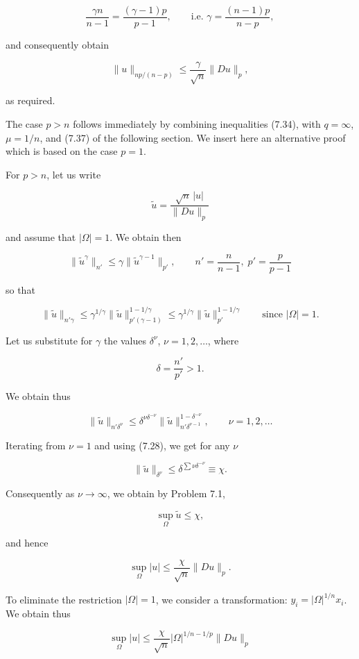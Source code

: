 \begin{theorem}
\[
\frac{\gamma n}{n-1} = \frac{(\gamma-1)p}{p-1}, \qquad \text{i.e. } \gamma = \frac{(n-1)p}{n-p},
\]

and consequently obtain

\[
\|u\|_{np/(n-p)} \le \frac{\gamma}{\sqrt{n}}\|Du\|_p,
\]

as required.

The case $p>n$ follows immediately by combining inequalities (7.34), with $q=\infty$, $\mu=1/n$, and (7.37) of the following section. We insert here an alternative proof which is based on the case $p=1$.

For $p>n$, let us write

\[
\tilde{u} = \frac{\sqrt{n}\,|u|}{\|Du\|_p}
\]


and assume that $|\Omega| = 1$. We obtain then

$$
\| \tilde{u}^{\gamma} \|_{n'} \le \gamma \| \tilde{u}^{\gamma - 1} \|_{p'}, \qquad n' = \frac{n}{n-1}, \; p' = \frac{p}{p-1}
$$

so that

$$
\| \tilde{u} \|_{n'\gamma} \le \gamma^{1/\gamma} \| \tilde{u} \|_{p'(\gamma - 1)}^{1 - 1/\gamma}
\le \gamma^{1/\gamma} \| \tilde{u} \|_{p'}^{1 - 1/\gamma} \qquad \text{since } |\Omega| = 1 .
$$

Let us substitute for $\gamma$ the values $\delta^{\nu}$, $\nu = 1,2,\ldots$, where

$$
\delta = \frac{n'}{p'} > 1.
$$

We obtain thus

$$
\| \tilde{u} \|_{n'\delta^{\nu}} \le \delta^{\nu \delta^{-\nu}} \| \tilde{u} \|_{n'\delta^{\nu-1}}^{1 - \delta^{-\nu}}, \qquad \nu = 1,2,\ldots
$$

Iterating from $\nu = 1$ and using (7.28), we get for any $\nu$

$$
\| \tilde{u} \|_{\delta^{\nu}} \le \delta^{\sum \nu \delta^{-\nu}} \equiv \chi .
$$

Consequently as $\nu \to \infty$, we obtain by Problem 7.1,

$$
\sup_{\Omega} \tilde{u} \le \chi,
$$

and hence

$$
\sup_{\Omega} |u| \le \frac{\chi}{\sqrt{n}} \| Du \|_{p} .
$$

To eliminate the restriction $|\Omega| = 1$, we consider a transformation:
$y_i = |\Omega|^{1/n} x_i$.
We obtain thus

$$
\sup_{\Omega} |u| \le \frac{\chi}{\sqrt{n}} |\Omega|^{1/n - 1/p} \| Du \|_{p}
$$


\end{theorem}
